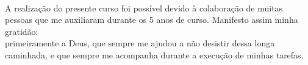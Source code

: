   \\ [6mm]

A realiza\c{c}\~{a}o do presente curso foi poss\'ivel devido \`a colabora\c{c}\~{a}o de muitas pessoas que me auxiliaram durante os 5 anos de curso. Manifesto assim minha gratid\~ao:
\\

 primeiramente a Deus, que sempre me ajudou a n\~ao desistir dessa longa caminhada, e que sempre me acompanha durante a execu\c{c}\~{a}o de minhas tarefas. 
\\




